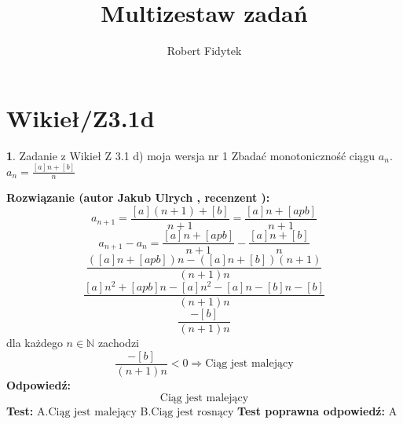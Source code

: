 \documentclass[12pt, a4paper]{article}
\title{Multizestaw zadań}
\author{Robert Fidytek}
\date{}
\theoremstyle{definition} %
\newtheorem{zad}{}
\newcommand{\kategoria}[1]{\section{#1}} %
\newcommand{\zadStart}[1]{\begin{zad}#1\newline} %
\newcommand{\zadStop}{\end{zad}}   %
\newcommand{\rozwStart}[2]{\noindent \textbf{Rozwiązanie (autor #1 , recenzent #2): }\newline} %
\newcommand{\rozwStop}{\newline}                                            %
\newcommand{\odpStart}{\noindent \textbf{Odpowiedź:}\newline}    %
\newcommand{\odpStop}{\newline}                                             %
\newcommand{\testStart}{\noindent \textbf{Test:}\newline} %
\newcommand{\testStop}{\newline} %
\newcommand{\kluczStart}{\noindent \textbf{Test poprawna odpowiedź:}\newline} %
\newcommand{\kluczStop}{\newline} %
\begin{document}
\maketitle


\kategoria{Wikieł/Z3.1d}
\zadStart{Zadanie z Wikieł Z 3.1 d) moja wersja nr 1}
Zbadać monotoniczność ciągu $a_{n}$.\\ $a_{n}=\frac{[a]n+[b]}{n}$
\zadStop
\rozwStart{Jakub Ulrych}{}
$$a_{n+1}=\frac{[a](n+1)+[b]}{n+1}=\frac{[a]n+[apb]}{n+1}$$
$$a_{n+1}-a_{n}=\frac{[a]n+[apb]}{n+1}-\frac{[a]n+[b]}{n}$$
$$\frac{([a]n+[apb])n-([a]n+[b])(n+1)}{(n+1)n}$$
$$\frac{[a]n^{2}+[apb]n-[a]n^{2}-[a]n-[b]n-[b]}{(n+1)n}$$
$$\frac{-[b]}{(n+1)n}$$
dla każdego $n\in\mathbb{N}$ zachodzi
$$\frac{-[b]}{(n+1)n}<0\Rightarrow \text{Ciąg jest malejący}$$
\rozwStop
\odpStart
$$\text{Ciąg jest malejący}$$
\odpStop
\testStart
A.$\text{Ciąg jest malejący}$
B.$\text{Ciąg jest rosnący}$
\testStop
\kluczStart
A
\kluczStop
\end{document}
